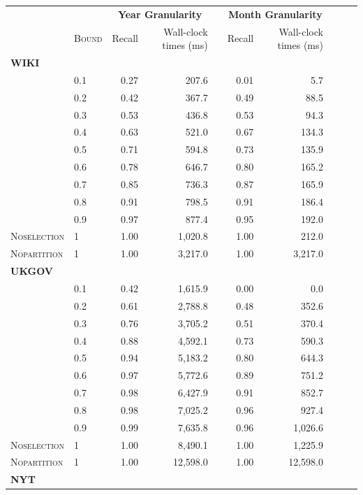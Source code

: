 \begin{table}\footnotesize
\centering
  \begin{tabular}{@{}llrrrrrrrr@{}}
  \toprule
  \multicolumn{2}{l}{} & \multicolumn{2}{c}{\textbf{Year Granularity}} & \phantom{ab} & \multicolumn{2}{c}{\textbf{Month  Granularity}}\\ 
  \cmidrule{3-4} \cmidrule{6-7}
  &\textsc{Bound} & Recall & Wall-clock times (ms) && Recall & Wall-clock times (ms)\\
   \midrule
\textbf{WIKI}\\
& 0.1 & 0.27 & 207.6 && 0.01 & 5.7\\
& 0.2 & 0.42 & 367.7 && 0.49 & 88.5\\
& 0.3 & 0.53 & 436.8 && 0.53 & 94.3\\
& 0.4 & 0.63 & 521.0 && 0.67 & 134.3\\
& 0.5 & 0.71 & 594.8 && 0.73 & 135.9\\
& 0.6 & 0.78 & 646.7 && 0.80 & 165.2\\
& 0.7 & 0.85 & 736.3 && 0.87 & 165.9\\
& 0.8 & 0.91 & 798.5 && 0.91 & 186.4\\
& 0.9 & 0.97 & 877.4 && 0.95 & 192.0\\
\textsc{Noselection} & 1 & 1.00 & 1,020.8 && 1.00 & 212.0\\
\textsc{Nopartition} & 1 & 1.00 & 3,217.0 && 1.00 & 3,217.0\\
  \midrule
\textbf{UKGOV}\\
& 0.1 & 0.42 & 1,615.9 && 0.00 & 0.0\\
& 0.2 & 0.61 & 2,788.8 && 0.48 & 352.6\\
& 0.3 & 0.76 & 3,705.2 && 0.51 & 370.4\\
& 0.4 & 0.88 & 4,592.1 && 0.73 & 590.3\\
& 0.5 & 0.94 & 5,183.2 && 0.80 & 644.3\\
& 0.6 & 0.97 & 5,772.6 && 0.89 & 751.2\\
& 0.7 & 0.98 & 6,427.9 && 0.91 & 852.7\\
& 0.8 & 0.98 & 7,025.2 && 0.96 & 927.4\\
& 0.9 & 0.99 & 7,635.8 && 0.96 & 1,026.6\\
\textsc{Noselection}& 1 & 1.00 & 8,490.1 && 1.00 & 1,225.9\\
\textsc{Nopartition} & 1 & 1.00 & 12,598.0 && 1.00 & 12,598.0\\
\midrule
\textbf{NYT}\\

\end{tabular}
\end{table}
